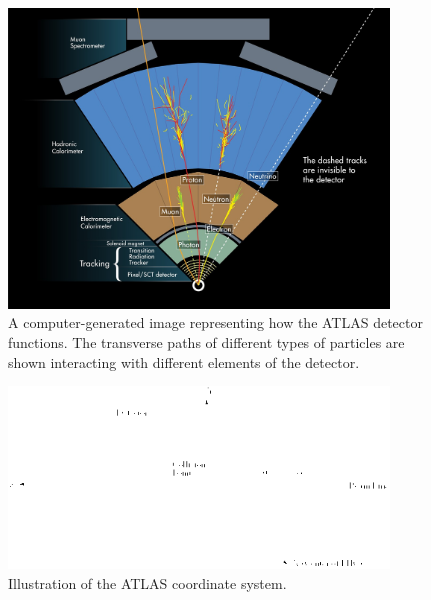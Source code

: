 \begin{figure}[tp]
  \centering
  \includegraphics[width=0.90\textwidth]{fig/atlas/atlas-wedge.jpg}
  \caption{A computer-generated image representing how the ATLAS detector functions. The transverse paths of different types of particles are shown interacting with different elements of the detector\cite{atlas-wedge}.}
  \label{fig:atlas-wedge}
\end{figure}
\begin{figure}[tp]
  \centering
  \includegraphics[width=0.90\textwidth]{fig/atlas/coord}
  \caption{Illustration of the ATLAS coordinate system\cite{Schott:2014sea}.}
  \label{fig:atlas-coord}
\end{figure}

